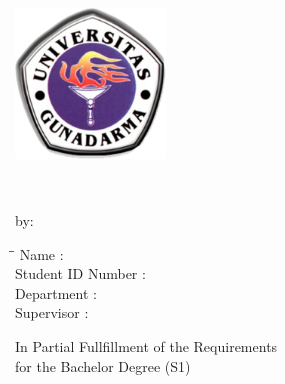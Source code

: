\cleardoublepage
{}

\begin{titlepage}

\begin{adjustwidth}{0cm}{0cm}
\begin{center}

\large

\hfill

\vfill

\begingroup
{\LARGE
\textbf{\myUniUppercase} \\
\myFacultyLongUppercase \\
}
\endgroup

\vfill

\includegraphics[width=4cm]{include/logo} \\ \medskip

\vfill

\textbf{{\LARGE
\myTitleLineOne\\
\myTitleLineTwo
}}

\vfill

by:

\bigskip

\begin{minipage}[c]{\textwidth}
\begin{tabbing}
\hspace*{4cm}\=\hspace*{0.5cm}\= \kill
Name \>:\> \myName \\
Student ID Number \>:\> \myNPM \\
Department \>:\> \myDepartmentShort \\
Supervisor \>:\> \mySupervisor
\end{tabbing}
\end{minipage}

\bigskip

In Partial Fullfillment of the Requirements\\
for the Bachelor Degree (S1)

\bigskip

\myCityUppercase \\
\myYear \\

\vfill

\end{center}
\end{adjustwidth}

\end{titlepage}
